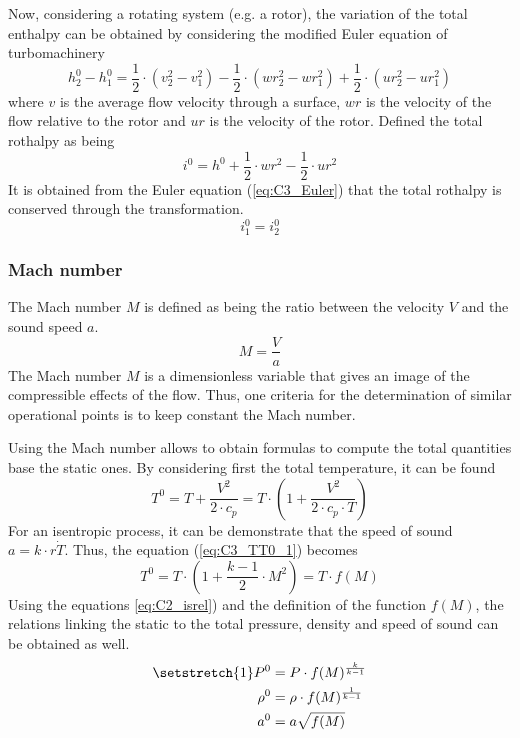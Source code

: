 Now, considering a rotating system (e.g. a rotor), the variation of the total enthalpy can be obtained by considering the modified Euler equation of turbomachinery
\begin{equation}
h_2^0 - h_1^0 = \frac{1}{2}\cdot \left(v_2^2 - v_1^2\right) - \frac{1}{2}\cdot \left(wr_2^2 - wr_1^2\right) + \frac{1}{2}\cdot \left(ur_2^2 - ur_1^2\right)\label{eq:C3_Euler}
\end{equation}
where $v$ is the average flow velocity through a surface, $wr$ is the velocity of the flow relative to the rotor and $ur$ is the velocity of the rotor. Defined the total rothalpy as being 
\begin{equation}
i^0 = h^0 + \frac{1}{2}\cdot wr^2 - \frac{1}{2}\cdot ur^2 
\end{equation}
It is obtained from the Euler equation (\ref{eq:C3_Euler}) that the total rothalpy is conserved through the transformation.
\begin{equation}
i_1^0 = i_2^0 \label{eq:C3_icons}
\end{equation}
\subsubsection{Mach number}
The Mach number $M$ is defined as being the ratio between the velocity $V$ and the sound speed $a$.
\begin{equation}
M = \frac{V}{a} \label{eq:C3_Mach}
\end{equation}
The Mach number $M$ is a dimensionless variable that gives an image of the compressible effects of the flow. Thus, one criteria for the determination of similar operational points is to keep constant the Mach number.

Using the Mach number allows to obtain formulas to compute the total quantities base the static ones. By considering first the total temperature, it can be found
\begin{equation}
T^0 = T + \frac{V^2}{2\cdot c_p} = T\cdot\left(1 + \frac{V^2}{2\cdot c_p\cdot T}\right)\label{eq:C3_TT0_1}
\end{equation}
For an isentropic process, it can be demonstrate that the speed of sound $a=k\cdot r\dot T$. Thus, the equation (\ref{eq:C3_TT0_1}) becomes
\begin{equation}
T^0 = T\cdot\left(1 + \frac{k-1}{2}\cdot M^2\right) = T\cdot f(M) \label{eq:C3_TT0}
\end{equation}
Using the equations \ref{eq:C2_isrel}) and the definition of the function $f(M)$, the relations linking the static to the total pressure, density and speed of sound can be obtained as well.
\begin{align}
\setstretch{1}
P^0 &= P\cdot f(M)^\frac{k}{k-1}\label{eq:C3_PP0}\\
\rho^0 &= \rho\cdot f(M)^\frac{1}{k-1}\label{eq:C3_rhorho0}\\
a^0 &= a\sqrt{f(M)} \label{eq:C3_aa0}
\end{align}
